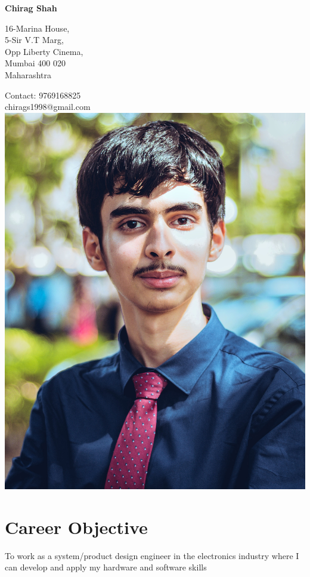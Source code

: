 \documentclass{article}
\begin{document}
	
	\begin{center}
		\huge\textbf{Chirag Shah}			
	\end{center}
	
	\hrulefill
	
	\noindent \parbox[t]{0.7\linewidth}
	{
		16-Marina House, \\ 5-Sir V.T Marg, \\ Opp Liberty Cinema,\\ Mumbai 400 020 \\ Maharashtra
	}	 
	\vspace{1cm}
	\parbox[t]{0.45\linewidth}
	{
		Contact: 9769168825 \\ chirags1998@gmail.com \\		
		\includegraphics[scale =.1]{photo.jpg}
	}

	\section*{Career Objective}
	To work as a system/product design engineer in the electronics industry where I can develop and apply my hardware and software skills
\end{document}
